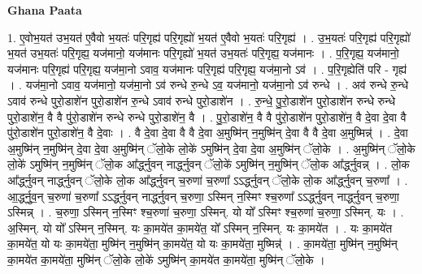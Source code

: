 \documentclass[17pt]{extarticle}
\begin{document}
\textbf{Ghana Paata } \newline

1. ए॒वोभ॒यत॑ उभ॒यत॑ ए॒वैवो भ॒यतः॑ परि॒गृह्य॑ परि॒गृह्यो॑ भ॒यत॑ ए॒वैवो भ॒यतः॑ परि॒गृह्य॑ । . उ॒भ॒यतः॑ परि॒गृह्य॑ परि॒गृह्यो॑ भ॒यत॑ उभ॒यतः॑ परि॒गृह्य॒ यज॑मानो॒ यज॑मानः परि॒गृह्यो॑ भ॒यत॑ उभ॒यतः॑ परि॒गृह्य॒ यज॑मानः । . प॒रि॒गृह्य॒ यज॑मानो॒ यज॑मानः परि॒गृह्य॑ परि॒गृह्य॒ यज॑मा॒नो ऽवाव॒ यज॑मानः परि॒गृह्य॑ परि॒गृह्य॒ यज॑मा॒नो ऽव॑ । . प॒रि॒गृह्येति॑ परि - गृह्य॑ । . यज॑मा॒नो ऽवाव॒ यज॑मानो॒ यज॑मा॒नो ऽव॑ रुन्धे रु॒न्धे ऽव॒ यज॑मानो॒ यज॑मा॒नो ऽव॑ रुन्धे । . अव॑ रुन्धे रु॒न्धे ऽवाव॑ रुन्धे पुरो॒डाशे॑न पुरो॒डाशे॑न रु॒न्धे ऽवाव॑ रुन्धे पुरो॒डाशे॑न । . रु॒न्धे॒ पु॒रो॒डाशे॑न पुरो॒डाशे॑न रुन्धे रुन्धे पुरो॒डाशे॑न॒ वै वै पु॑रो॒डाशे॑न रुन्धे रुन्धे पुरो॒डाशे॑न॒ वै । . पु॒रो॒डाशे॑न॒ वै वै पु॑रो॒डाशे॑न पुरो॒डाशे॑न॒ वै दे॒वा दे॒वा वै पु॑रो॒डाशे॑न पुरो॒डाशे॑न॒ वै दे॒वाः । . वै दे॒वा दे॒वा वै वै दे॒वा अ॒मुष्मि॑न् न॒मुष्मि॑न् दे॒वा वै वै दे॒वा अ॒मुष्मिन्न्॑ । . दे॒वा अ॒मुष्मि॑न् न॒मुष्मि॑न् दे॒वा दे॒वा अ॒मुष्मि॑न् ॅलो॒के लो॒के॑ ऽमुष्मि॑न् दे॒वा दे॒वा अ॒मुष्मि॑न् ॅलो॒के । . अ॒मुष्मि॑न् ॅलो॒के लो॒के॑ ऽमुष्मि॑न् न॒मुष्मि॑न् ॅलो॒क आ᳚र्द्ध्नुवन् नार्द्ध्नुवन् ॅलो॒के॑ ऽमुष्मि॑न् न॒मुष्मि॑न् ॅलो॒क आ᳚र्द्ध्नुवन्न् । . लो॒क आ᳚र्द्ध्नुवन् नार्द्ध्नुवन् ॅलो॒के लो॒क आ᳚र्द्ध्नुवन् च॒रुणा॑ च॒रुणा᳚ ऽऽर्द्ध्नुवन् ॅलो॒के लो॒क आ᳚र्द्ध्नुवन् च॒रुणा᳚ । . आ॒र्द्ध्नु॒व॒न् च॒रुणा॑ च॒रुणा᳚ ऽऽर्द्ध्नुवन् नार्द्ध्नुवन् च॒रुणा॒ ऽस्मिन् न॒स्मिꣳ श्च॒रुणा᳚ ऽऽर्द्ध्नुवन् नार्द्ध्नुवन् च॒रुणा॒ ऽस्मिन्न् । . च॒रुणा॒ ऽस्मिन् न॒स्मिꣳ श्च॒रुणा॑ च॒रुणा॒ ऽस्मिन्. यो यो᳚ ऽस्मिꣳ श्च॒रुणा॑ च॒रुणा॒ ऽस्मिन्. यः । . अ॒स्मिन्. यो यो᳚ ऽस्मिन् न॒स्मिन्. यः का॒मये॑त का॒मये॑त॒ यो᳚ ऽस्मिन् न॒स्मिन्. यः का॒मये॑त । . यः का॒मये॑त का॒मये॑त॒ यो यः का॒मये॑ता॒ मुष्मि॑न् न॒मुष्मि॑न् का॒मये॑त॒ यो यः का॒मये॑ता॒ मुष्मिन्न्॑ । . का॒मये॑ता॒ मुष्मि॑न् न॒मुष्मि॑न् का॒मये॑त का॒मये॑ता॒ मुष्मि॑न् ॅलो॒के लो॒के॑ ऽमुष्मि॑न् का॒मये॑त का॒मये॑ता॒ मुष्मि॑न् ॅलो॒के । \newline
\end{document}

